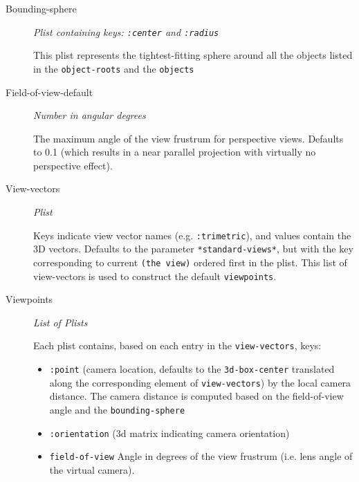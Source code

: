 \documentclass [11pt]{book}
\begin{document}
\begin{itemize}
\begin{description}
\item [Bounding-sphere]
\emph{Plist containing keys: \texttt{:center} and \texttt{:radius}}

 This plist represents the tightest-fitting sphere
around all the objects listed in the \texttt{object-roots} and the \texttt{objects}




\item [Field-of-view-default]
\emph{Number in angular degrees}

 The maximum angle of the view frustrum for perspective views.
Defaults to 0.1 (which results in a near parallel projection with virtually no perspective effect).




\item [View-vectors]
\emph{Plist}

 Keys indicate view vector names (e.g. \texttt{:trimetric}), and values contain the 3D vectors. Defaults to the
parameter \texttt{*standard-views*}, but with the key corresponding to current \texttt{(the view)} ordered
first in the plist. This list of view-vectors is used to construct the default \texttt{viewpoints}.




\item [Viewpoints]
\emph{List of Plists}

 Each plist contains, based on each entry in the \texttt{view-vectors}, keys:


\begin{itemize}

\item \texttt{:point} (camera location, defaults to the \texttt{3d-box-center} translated
along the corresponding element of \texttt{view-vectors}) by the local camera distance.
The camera distance is computed based on the field-of-view angle and
the \texttt{bounding-sphere}


\item \texttt{:orientation} (3d matrix indicating camera orientation)


\item \texttt{field-of-view} Angle in degrees of the view frustrum (i.e. lens angle of the virtual camera).


\end{itemize}






\end{description}
\end{itemize}
\end{document}
